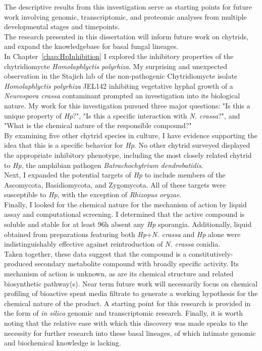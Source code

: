 \indent The descriptive results from this investigation serve as starting points for future work involving genomic, transcriptomic, and proteomic analyses from multiple developmental stages and timepoints.\\
\indent The research presented in this dissertation will inform future work on chytrids, and expand the knowledgebase for basal fungal lineages.\\

\indent In Chapter~\ref{chap:HpInhibition} I explored the inhibitory properties of the chytridiomycte \textit{Homolaphlyctis polyrhiza}. My surprising and unexpected observation in the Stajich lab of the non-pathogenic Chytridiomycte isolate \textit{Homolaphlyctis polyrhiza} JEL142 inhibiting vegetative hyphal growth of a \textit{Neurospora crassa} contaminant prompted an investigation into its biological nature. My work for this investigation pursued three major questions: "Is this a unique property of \textit{Hp}?", "Is this a specific interaction with \textit{N. crassa}?", and "What is the chemical nature of the responsible compound?"\\
\indent By examining five other chytrid species in culture, I have evidence supporting the idea that this is a specific behavior for \textit{Hp}. No other chytrid surveyed displayed the appropriate inhibitory phenotype, including the most closely related chytrid to \textit{Hp}, the amphibian pathogen \textit{Batrachochytrium dendrobatidis}.\\
\indent Next, I expanded the potential targets of \textit{Hp} to include members of the Ascomycota, Basidiomycota, and Zygomycota. All of these targets were susceptible to \textit{Hp}, with the exception of \textit{Rhizopus oryzae}.\\
\indent Finally, I looked for the chemical nature for the mechanism of action by liquid assay and computational screening. I determined that the active compound is soluble and stable for at least 96h absent any \textit{Hp} sporangia. Additionally, liquid obtained from preparations featuring both \textit{Hp}+\textit{N. crassa} and \textit{Hp} alone were indistinguishably effective against reintroduction of \textit{N. crassa} conidia.\\
\indent Taken together, these data suggest that the compound is a constitutively-produced secondary metabolite compound with broadly specific activity. Its mechanism of action is unknown, as are its chemical structure and related biosynthetic pathway(s). Near term future work will necessarily focus on chemical profiling of bioactive spent media filtrate to generate a working hypothesis for the chemical nature of the product. A starting point for this research is provided in the form of \textit{in silico} genomic and transcriptomic research. Finally, it is worth noting that the relative ease with which this discovery was made speaks to the necessity for further research into these basal lineages, of which intimate genomic and biochemical knowledge is lacking.\\
